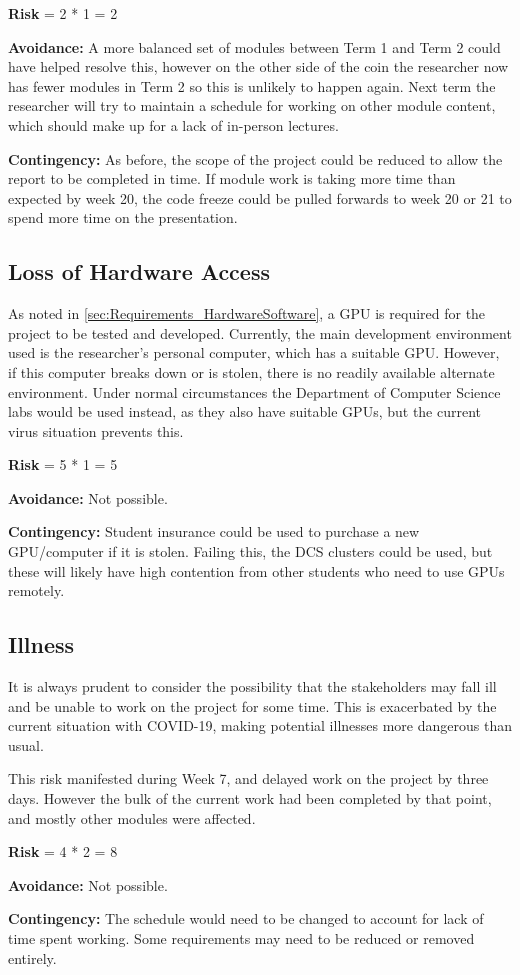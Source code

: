 \textbf{Risk} = 2 * 1 = 2

\textbf{Avoidance:}
A more balanced set of modules between Term 1 and Term 2 could have helped resolve this, however on the other side of the coin the researcher now has fewer modules in Term 2 so this is unlikely to happen again.
Next term the researcher will try to maintain a schedule for working on other module content, which should make up for a lack of in-person lectures.

\textbf{Contingency:}
As before, the scope of the project could be reduced to allow the report to be completed in time.
If module work is taking more time than expected by week 20, the code freeze could be pulled forwards to week 20 or 21 to spend more time on the presentation.


\subsection{Loss of Hardware Access}
As noted in \cref{sec:Requirements_HardwareSoftware}, a GPU is required for the project to be tested and developed.
Currently, the main development environment used is the researcher's personal computer, which has a suitable GPU.
However, if this computer breaks down or is stolen, there is no readily available alternate environment.
Under normal circumstances the Department of Computer Science labs would be used instead, as they also have suitable GPUs, but the current virus situation prevents this.

\textbf{Risk} = 5 * 1 = 5

\textbf{Avoidance:}
Not possible.

\textbf{Contingency:}
Student insurance could be used to purchase a new GPU/computer if it is stolen.
Failing this, the DCS clusters could be used, but these will likely have high contention from other students who need to use GPUs remotely.

\subsection{Illness}
It is always prudent to consider the possibility that the stakeholders may fall ill and be unable to work on the project for some time.
This is exacerbated by the current situation with COVID-19, making potential illnesses more dangerous than usual.

This risk manifested during Week 7, and delayed work on the project by three days.
However the bulk of the current work had been completed by that point, and mostly other modules were affected.

\textbf{Risk} = 4 * 2 = 8

\textbf{Avoidance:}
Not possible.

\textbf{Contingency:}
The schedule would need to be changed to account for lack of time spent working.
Some requirements may need to be reduced or removed entirely.

